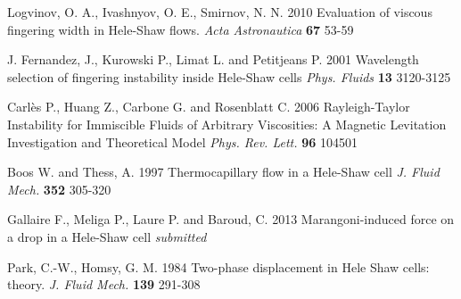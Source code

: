 \documentclass[aip,preprint,jmp,showpacs,showkeys]{revtex4-1}
\begin{document}
\begin{thebibliography}{}
 
{Logvinov, O. A., Ivashnyov, O. E., Smirnov, N. N.} 2010
{Evaluation of viscous fingering width in Hele-Shaw flows.}
\textit{Acta Astronautica}
\textbf{67} 53-59



{J. Fernandez, J., Kurowski P., Limat L. and Petitjeans P.} 2001
{Wavelength selection of fingering instability inside Hele-Shaw cells}
\textit{Phys. Fluids}
\textbf{13} 3120-3125

{Carl\`es P., Huang Z., Carbone G. and Rosenblatt C.} 2006
{Rayleigh-Taylor Instability for Immiscible Fluids of Arbitrary Viscosities: A Magnetic Levitation Investigation and Theoretical Model}
\textit{Phys. Rev. Lett.}
\textbf{96} 104501


{Boos W. and Thess, A.} 1997
{Thermocapillary flow in a {Hele-Shaw} cell}
\textit{J. Fluid Mech.}
\textbf{352} 305-320

{Gallaire F., Meliga P., Laure P. and Baroud, C.} 2013
{Marangoni-induced force on a drop in a Hele-Shaw cell}
\textit{submitted}


{Park, C.-W., Homsy, G. M.} 1984
{Two-phase displacement in Hele Shaw cells: theory.}
\textit{J. Fluid Mech.}
\textbf{139} 291-308

\end{thebibliography}
\end{document}
